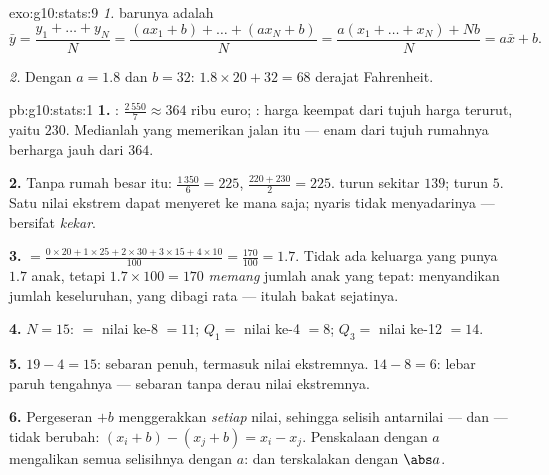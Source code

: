 \begin{solution}{exo:g10:stats:9}
\emph{1.}  barunya adalah
\[
\bar y = \frac{y_1 + \dots + y_N}{N}
= \frac{(a x_1 + b) + \dots + (a x_N + b)}{N}
= \frac{a(x_1 + \dots + x_N) + Nb}{N}
= a \bar x + b .
\]

\emph{2.} Dengan $a = 1.8$ dan $b = 32$: 
$1.8 \times 20 + 32 = 68$ derajat Fahrenheit.
\end{solution}

\begin{solution}{pb:g10:stats:1}
\textbf{1.} : $\frac{2\,550}{7} \approx 364$ ribu
euro; : harga keempat dari tujuh harga terurut, yaitu $230$.
Medianlah yang memerikan jalan itu --- enam dari tujuh rumahnya
berharga jauh dari $364$.

\textbf{2.} Tanpa rumah besar itu:  $\frac{1\,350}{6} = 225$,
 $\frac{220 + 230}{2} = 225$.  turun sekitar
$139$;  turun $5$. Satu nilai ekstrem dapat menyeret 
ke mana saja;  nyaris tidak menyadarinya ---  bersifat \emph{kekar}.

\textbf{3.}  $= \frac{0 \times 20 + 1 \times 25 + 2 \times
30 + 3 \times 15 + 4 \times 10}{100} = \frac{170}{100} = 1.7$.
Tidak ada keluarga yang punya $1.7$ anak, tetapi $1.7 \times 100 = 170$
\emph{memang} jumlah anak yang tepat:  menyandikan
jumlah keseluruhan, yang dibagi rata --- itulah bakat sejatinya.

\textbf{4.} $N = 15$:  $=$ nilai ke-8 $= 11$;
$Q_1 =$ nilai ke-4 $= 8$; $Q_3 =$ nilai ke-12 $= 14$.

\textbf{5.}  $19 - 4 = 15$: sebaran penuh, termasuk nilai
ekstremnya.  $14 - 8 = 6$: lebar
paruh tengahnya --- sebaran tanpa derau nilai ekstremnya.

\textbf{6.} Pergeseran $+b$ menggerakkan \emph{setiap} nilai, sehingga
selisih antarnilai ---  dan  --- tidak berubah:
$(x_i + b) - (x_j + b) = x_i - x_j$. Penskalaan dengan $a$
mengalikan semua selisihnya dengan $a$:  dan 
terskalakan dengan $\abs a$.


\end{solution}
